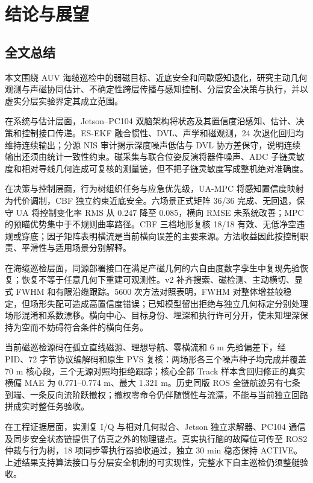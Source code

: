 
\chapter{结论与展望}

\section{全文总结}\label{sec:ch06-6-1}

本文围绕 AUV 海缆巡检中的弱磁目标、近底安全和间歇感知退化，研究主动几何观测与声磁协同估计、不确定性跨层传播与感知控制、分层安全决策与执行，并以虚实分层实验界定其成立范围。

在系统与估计层面，Jetson--PC104 双脑架构将状态及其置信度沿感知、估计、决策和控制接口传递。ES-EKF 融合惯性、DVL、声学和磁观测，24 次退化回归均维持连续输出；分源 NIS 审计揭示深度噪声低估与 DVL 协方差保守，说明连续输出还须由统计一致性约束。磁采集与联合位姿反演将器件噪声、ADC 子链灵敏度和相对导线几何连成可复核的测量链，但不把子链灵敏度写成整机绝对准确度。

在决策与控制层面，行为树组织任务与应急优先级，UA-MPC 将感知置信度映射为代价调制，CBF 独立约束近底安全。六场景正式矩阵 36/36 完成、无回退，保守 UA 将控制变化率 RMS 从 0.247 降至 0.085，横向 RMSE 未系统改善；MPC 的预瞄优势集中于不规则曲率路径。CBF 三档地形复核 18/18 有效、无低净空违规或穿底；因子矩阵表明横流是当前横向误差的主要来源。方法收益因此按控制职责、平滑性与适用场景分别解释。

在海缆巡检层面，同源部署接口在满足产磁几何的六自由度数字孪生中复现先验恢复；恢复不等于任意几何下重建可观测性。v2 补齐搜索、磁检测、主动横切、显式 FWHM 和有限沿缆跟踪。5600 次方法对照表明，FWHM 对整体增益较稳定，但场形失配可造成高置信度错误；已知模型留出拒绝与独立几何标定分别处理场形混淆和系数漂移。横向中心、目标身份、埋深和执行许可分开，使未知埋深保持为空而不妨碍符合条件的横向任务。

当前磁巡检源码在孤立直线磁源、理想导航、零横流和 6 m 先验偏差下，经 PID、72 字节协议编解码和原生 PVS 复核：两场形各三个噪声种子均完成并覆盖 70 m 核心段，三个无源对照均拒绝跟踪；核心全部 Track 样本含回归修正的真实横偏 MAE 为 0.771--0.774 m、最大 1.321 m。历史同版 ROS 全链航迹另有七条到端、一条反向流阶跃撤权；撤权零命令仍伴随惯性与流漂，不能与当前独立回路拼成实时整任务验收。

在工程证据层面，实测复 I/Q 与相对几何拟合、Jetson 独立求解器、PC104 通信及同步安全状态链提供了仿真之外的物理锚点。真实执行脑的故障位可传至 ROS2 仲裁与行为树，18 项同步零执行器验收通过，独立 30 min 稳态保持 ACTIVE。上述结果支持算法接口与分层安全机制的可实现性，完整水下自主巡检仍须整艇验收。

